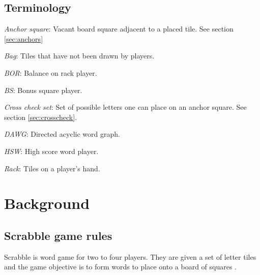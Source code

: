\documentclass[a4paper, 12pt]{report}
\begin{document}
\section {Terminology}
\label{sec:terminology}

\begin{description}
\item{\emph{Anchor square}}: Vacant board square adjacent to a placed tile. See section \ref{sec:anchors}

\item{\emph{Bag}}: Tiles that have not been drawn by players.

\item{\emph{BOR}}: Balance on rack player.

\item{\emph{BS}}: Bonus square player.

\item{\emph{Cross check set}}: Set of possible letters one can place on an anchor square. See section \ref{sec:crosscheck}.

\item{\emph{DAWG}}: Directed acyclic word graph.

\item{\emph{HSW}}: High score word player.

\item{\emph{Rack}}: Tiles on a player's hand. 

\end{description}







\chapter{Background}

\section{Scrabble game rules}
Scrabble is word game for two to four players. They are given a set of letter tiles and the game objective is to form words to place onto a board of squares \cite{ABSP} \cite{NASPA} \cite{forbund}.
\end{document}
